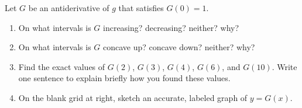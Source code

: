 \documentclass[11 pt]{article}
\newcommand{\tr}{\vspace{0.5in}}
\newcommand{\lr}{\vspace{1.0in}}
\newcommand{\mr}{\vspace{2.0in}}
\newcommand{\be}{\begin{enumerate}}
\newcommand{\ee}{\end{enumerate}}
\begin{document}
\begin{enumerate}
	Let $G$ be an antiderivative of $g$ that satisfies $G(0) = 1$.
	
	\be
		\item On what intervals is $G$ increasing?  decreasing? neither?  why?
		
		\lr
		
		\item On what intervals is $G$ concave up?  concave down?  neither?  why?
		
		\lr
		
		\item Find the exact values of $G(2)$, $G(3)$, $G(4)$, $G(6)$, and $G(10)$.  Write one sentence to explain briefly how you found these values.
		
		\mr \tr
		
		\item On the blank grid at right, sketch an accurate, labeled graph of $y = G(x)$.
		
	\ee
\end{enumerate}
\end{document}

